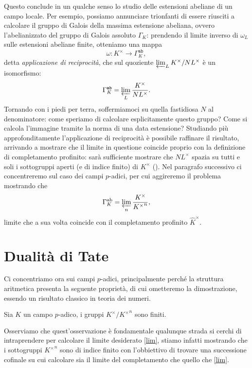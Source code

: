 Questo conclude in un qualche senso lo studio delle estensioni abeliane di un campo locale. Per esempio, possiamo annunciare trionfanti di essere riusciti a calcolare il gruppo di Galois della massima estensione abeliana, ovvero l'abelianizzato del gruppo di Galois assoluto $ \Gamma_K $: prendendo il limite inverso di $ \omega_L $ sulle estensioni abeliane finite, otteniamo una mappa
\[ \omega\colon K^\times \to \Gamma_K^{\texttt{ab}}, \]
detta \emph{applicazione di reciprocità}, che sul quoziente $ \varprojlim_L K^\times / NL^\times  $ è un isomorfismo:
\begin{equation}\label{lim}
	\Gamma_K^{\texttt{ab}} = \varprojlim_L \frac{K^\times}{NL^\times}.
\end{equation}
Tornando con i piedi per terra, soffermiamoci su quella fastidiosa $ N $ al denominatore: come speriamo di calcolare esplicitamente questo gruppo? Come si calcola l'immagine tramite la norma di una data estensione? Studiando più approfonditamente l'applicazione di reciprocità è possibile raffinare il risultato, arrivando a mostrare che il limite in questione coincide proprio con la definizione di completamento profinito: sarà sufficiente mostrare che $ NL^\times $ spazia su tutti e soli i sottogruppi aperti (e di indice finito) di $ K^\times $ (\cite[XIV.\S 6.1]{SerreFields}). Nel paragrafo successivo ci concentreremo sul caso dei campi $ p $-adici, per cui aggireremo il problema mostrando che
\[ \Gamma^\text{ab}_K = \varprojlim_n \frac{K^\times}{{K^\times}^n}, \]
limite che a sua volta coincide con il completamento profinito $ \hat{K}^\times $.

\section{Dualità di Tate}
Ci concentriamo ora sui campi $ p $-adici, principalmente perché la struttura aritmetica presenta la seguente proprietà, di cui ometteremo la dimostrazione, essendo un risultato classico in teoria dei numeri.

\begin{proposition}
	Sia $ K $ un campo $ p $-adico, i gruppi $ K^\times / {K^\times}^n $ sono finiti.
\end{proposition}

Osserviamo che quest'osservazione è fondamentale qualunque strada si cerchi di intraprendere per calcolare il limite desiderato \eqref{lim}, stiamo infatti mostrando che i sottogruppi $ {K^\times}^n $ sono di indice finito con l'obbiettivo di trovare una successione cofinale su cui calcolare sia il limite del completamento che quello che \eqref{lim}.

